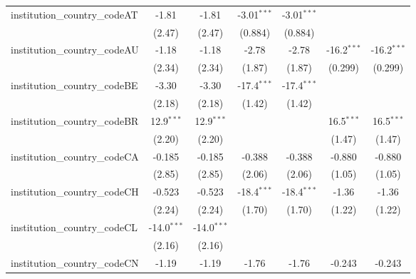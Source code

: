\begin{tabular}{lcccccc}
   institution\_country\_codeAT          & -1.81         & -1.81         & -3.01$^{***}$ & -3.01$^{***}$ &               &   \\   
                                         & (2.47)        & (2.47)        & (0.884)       & (0.884)       &               &   \\   
   institution\_country\_codeAU          & -1.18         & -1.18         & -2.78         & -2.78         & -16.2$^{***}$ & -16.2$^{***}$\\   
                                         & (2.34)        & (2.34)        & (1.87)        & (1.87)        & (0.299)       & (0.299)\\   
   institution\_country\_codeBE          & -3.30         & -3.30         & -17.4$^{***}$ & -17.4$^{***}$ &               &   \\   
                                         & (2.18)        & (2.18)        & (1.42)        & (1.42)        &               &   \\   
   institution\_country\_codeBR          & 12.9$^{***}$  & 12.9$^{***}$  &               &               & 16.5$^{***}$  & 16.5$^{***}$\\   
                                         & (2.20)        & (2.20)        &               &               & (1.47)        & (1.47)\\   
   institution\_country\_codeCA          & -0.185        & -0.185        & -0.388        & -0.388        & -0.880        & -0.880\\   
                                         & (2.85)        & (2.85)        & (2.06)        & (2.06)        & (1.05)        & (1.05)\\   
   institution\_country\_codeCH          & -0.523        & -0.523        & -18.4$^{***}$ & -18.4$^{***}$ & -1.36         & -1.36\\   
                                         & (2.24)        & (2.24)        & (1.70)        & (1.70)        & (1.22)        & (1.22)\\   
   institution\_country\_codeCL          & -14.0$^{***}$ & -14.0$^{***}$ &               &               &               &   \\   
                                         & (2.16)        & (2.16)        &               &               &               &   \\   
   institution\_country\_codeCN          & -1.19         & -1.19         & -1.76         & -1.76         & -0.243        & -0.243\\   

\end{tabular}
